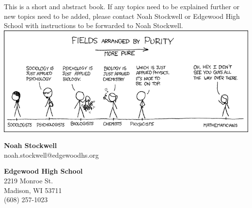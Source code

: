 This is a short and abstract book. If any topics need to be explained further or new topics need to be added, please contact Noah Stockwell or Edgewood High School with instructions to be forwarded to Noah Stockwell.
\vfill
\includegraphics[width=\textwidth]{images/purity.png}
\vspace{.25in}
\par \textbf{Noah Stockwell}\\
noah.stockwell@edgewoodhs.org\\
\par \textbf{Edgewood High School}\\
2219 Monroe St.\\ Madison, WI 53711\\ (608) 257-1023